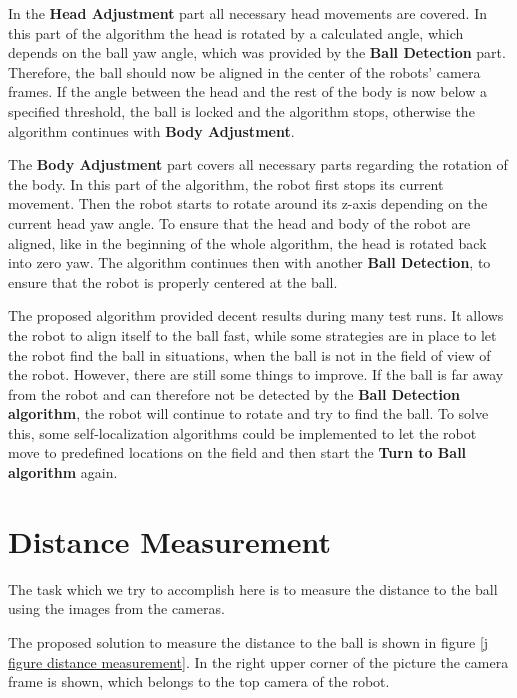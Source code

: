 In the \textbf{Head Adjustment} part all necessary head movements are covered.
In this part of the algorithm the head is rotated by a calculated angle, which
depends on the ball yaw angle, which was provided by the \textbf{Ball
  Detection} part. Therefore, the ball should now be aligned in the center of
the robots' camera frames. If the angle between the head and the rest of the
body is now below a specified threshold, the ball is locked and the algorithm
stops, otherwise the algorithm continues with \textbf{Body Adjustment}.

The \textbf{Body Adjustment} part covers all necessary parts regarding the
rotation of the body. In this part of the algorithm, the robot first stops its
current movement. Then the robot starts to rotate around its z-axis depending
on the current head yaw angle. To ensure that the head and body of the robot
are aligned, like in the beginning of the whole algorithm, the head is rotated
back into zero yaw. The algorithm continues then with another \textbf{Ball
  Detection}, to ensure that the robot is properly centered at the ball.

The proposed algorithm provided decent results during many test runs. It allows
the robot to align itself to the ball fast, while some strategies are in place
to let the robot find the ball in situations, when the ball is not in the
field of view of the robot. However, there are still some things to improve. If
the ball is far away from the robot and can therefore not be detected by the
\textbf{Ball Detection algorithm}, the robot will continue to rotate and try to
find the ball. To solve this, some self-localization algorithms could be
implemented to let the robot move to predefined locations on the field and then
start the \textbf{Turn to Ball algorithm} again.


\section{Distance Measurement}
\label{j sec distance measurement}

The task which we try to accomplish here is to measure the distance to the ball
using the images from the cameras.

The proposed solution to measure the distance to the ball is shown in figure
\ref{j figure distance measurement}. In the right upper corner of the picture
the camera frame is shown, which belongs to the top camera of the robot.

